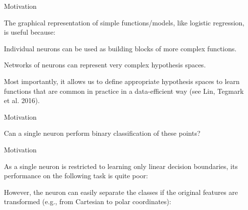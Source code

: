 \documentclass[11pt,compress,t,notes=noshow, xcolor=table]{beamer}
\begin{document}



\begin{framei}{Motivation}
\item The graphical representation of simple functions/models, like logistic regression, is useful because:
\item Individual neurons can be used as building blocks of more complex functions.
\item Networks of neurons can represent very complex hypothesis spaces.
\item Most importantly, it allows us to define appropriate hypothesis spaces to learn functions that are 
common in practice in a data-efficient way (see Lin, Tegmark et al. 2016).
\end{framei}


\begin{framei}{Motivation}
\item Can a single neuron perform binary classification of these points?
\end{framei}


\begin{framei}{Motivation}
\item As a single neuron is restricted to learning only linear decision boundaries, its performance on the following task is quite poor:
\item However, the neuron can easily separate the classes if the original features are transformed (e.g., from Cartesian to polar coordinates): 
\end{framei}
\end{document}
